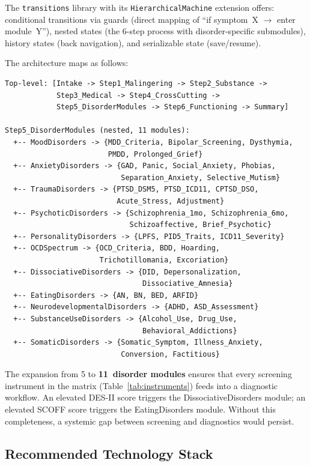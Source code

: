\documentclass[11pt,a4paper]{article}
\begin{document}
The \texttt{transitions} library with its \texttt{HierarchicalMachine} extension offers: conditional transitions via guards (direct mapping of ``if symptom~X $\to$ enter module~Y''), nested states (the 6-step process with disorder-specific submodules), history states (back navigation), and serializable state (save/resume).

The architecture maps as follows:

\begin{verbatim}
Top-level: [Intake -> Step1_Malingering -> Step2_Substance ->
            Step3_Medical -> Step4_CrossCutting ->
            Step5_DisorderModules -> Step6_Functioning -> Summary]

Step5_DisorderModules (nested, 11 modules):
  +-- MoodDisorders -> {MDD_Criteria, Bipolar_Screening, Dysthymia,
                        PMDD, Prolonged_Grief}
  +-- AnxietyDisorders -> {GAD, Panic, Social_Anxiety, Phobias,
                           Separation_Anxiety, Selective_Mutism}
  +-- TraumaDisorders -> {PTSD_DSM5, PTSD_ICD11, CPTSD_DSO,
                          Acute_Stress, Adjustment}
  +-- PsychoticDisorders -> {Schizophrenia_1mo, Schizophrenia_6mo,
                             Schizoaffective, Brief_Psychotic}
  +-- PersonalityDisorders -> {LPFS, PID5_Traits, ICD11_Severity}
  +-- OCDSpectrum -> {OCD_Criteria, BDD, Hoarding,
                      Trichotillomania, Excoriation}
  +-- DissociativeDisorders -> {DID, Depersonalization,
                                Dissociative_Amnesia}
  +-- EatingDisorders -> {AN, BN, BED, ARFID}
  +-- NeurodevelopmentalDisorders -> {ADHD, ASD_Assessment}
  +-- SubstanceUseDisorders -> {Alcohol_Use, Drug_Use,
                                Behavioral_Addictions}
  +-- SomaticDisorders -> {Somatic_Symptom, Illness_Anxiety,
                           Conversion, Factitious}
\end{verbatim}

The expansion from 5 to \textbf{11~disorder modules} ensures that every screening instrument in the matrix (Table~\ref{tab:instruments}) feeds into a diagnostic workflow. An elevated DES-II score triggers the DissociativeDisorders module; an elevated SCOFF score triggers the EatingDisorders module. Without this completeness, a systemic gap between screening and diagnostics would persist.

\subsection{Recommended Technology Stack}
\end{document}

